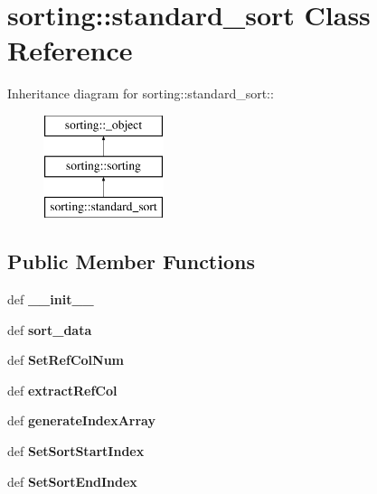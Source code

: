 \hypertarget{classsorting_1_1standard__sort}{
\section{sorting::standard\_\-sort Class Reference}
\label{d4/d39/classsorting_1_1standard__sort}
}
Inheritance diagram for sorting::standard\_\-sort::\begin{figure}[H]
\begin{center}
\leavevmode
\includegraphics[height=3cm]{d4/d39/classsorting_1_1standard__sort}
\end{center}
\end{figure}
\subsection*{Public Member Functions}
\begin{DoxyCompactItemize}
\item 
\hypertarget{classsorting_1_1standard__sort_ac29c41191d3be95569953afbdb59da3a}{
def {\bfseries \_\-\_\-init\_\-\_\-}}
\label{d4/d39/classsorting_1_1standard__sort_ac29c41191d3be95569953afbdb59da3a}

\item 
\hypertarget{classsorting_1_1standard__sort_a64f0375377b5e5d50001a4bab84bdd4d}{
def {\bfseries sort\_\-data}}
\label{d4/d39/classsorting_1_1standard__sort_a64f0375377b5e5d50001a4bab84bdd4d}

\item 
\hypertarget{classsorting_1_1standard__sort_ae1cbf3955b9ebd842e64266ec49b7456}{
def {\bfseries SetRefColNum}}
\label{d4/d39/classsorting_1_1standard__sort_ae1cbf3955b9ebd842e64266ec49b7456}

\item 
\hypertarget{classsorting_1_1standard__sort_a155072ea34fb041e442fa07f8b0f9240}{
def {\bfseries extractRefCol}}
\label{d4/d39/classsorting_1_1standard__sort_a155072ea34fb041e442fa07f8b0f9240}

\item 
\hypertarget{classsorting_1_1standard__sort_a8c6a1a636ca8ae65fe840eace3d5e01f}{
def {\bfseries generateIndexArray}}
\label{d4/d39/classsorting_1_1standard__sort_a8c6a1a636ca8ae65fe840eace3d5e01f}

\item 
\hypertarget{classsorting_1_1standard__sort_a65791ddb85af50eb23cb3c5f3404b274}{
def {\bfseries SetSortStartIndex}}
\label{d4/d39/classsorting_1_1standard__sort_a65791ddb85af50eb23cb3c5f3404b274}

\item 
\hypertarget{classsorting_1_1standard__sort_a918324b3f1f31c351e421a56fde07f44}{
def {\bfseries SetSortEndIndex}}
\label{d4/d39/classsorting_1_1standard__sort_a918324b3f1f31c351e421a56fde07f44}

\end{DoxyCompactItemize}
